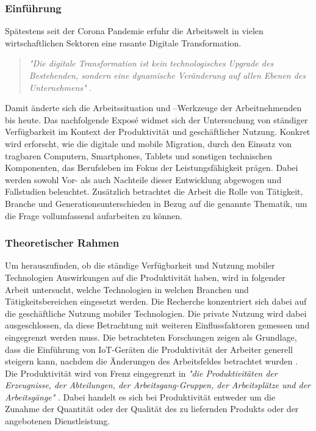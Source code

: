 \documentclass[12pt,a4paper]{article}
\title{\titlename}
\author{Reichard, Pia~~~Berger, Vivian~~~Engelhard, Philipp~~~Müller, Maximilian}
\date{\exposedate}
\begin{document}

\maketitle 
\thispagestyle{empty} %
\newpage	

\subsubsection*{Einführung }
Spätestens seit der Corona Pandemie erfuhr die Arbeitswelt in vielen wirtschaftlichen Sektoren eine rasante Digitale Transformation.

\begin{quote}
\emph{"Die digitale Transformation ist kein technologisches Upgrade des Bestehenden, sondern eine dynamische Veränderung auf allen Ebenen des Unternehmens"} \parencite{frauenhofer}.
\end{quote}

Damit änderte sich die Arbeitssituation und –Werkzeuge der Arbeitnehmenden bis heute. Das nachfolgende Exposé widmet sich der Untersuchung von ständiger Verfügbarkeit im Kontext der Produktivität und geschäftlicher Nutzung. Konkret wird erforscht, wie die digitale und mobile Migration, durch den Einsatz von tragbaren Computern, Smartphones, Tablets und sonstigen technischen Komponenten, das Berufsleben im Fokus der Leistungsfähigkeit prägen. Dabei werden sowohl Vor- als auch Nachteile dieser Entwicklung abgewogen und Fallstudien beleuchtet. Zusätzlich betrachtet die Arbeit die Rolle von Tätigkeit, Branche und Generationsunterschieden in Bezug auf die genannte Thematik, um die Frage vollumfassend aufarbeiten zu können.

\subsubsection*{Theoretischer Rahmen}
Um herauszufinden, ob die ständige Verfügbarkeit und Nutzung mobiler Technologien Auswirkungen auf die Produktivität haben, wird in folgender Arbeit untersucht, welche Technologien in welchen Branchen und Tätigkeitsbereichen eingesetzt werden. 
Die Recherche konzentriert sich dabei auf die geschäftliche Nutzung mobiler Technologien.  
Die private Nutzung wird dabei ausgeschlossen, da diese Betrachtung mit weiteren Einflussfaktoren gemessen und eingegrenzt werden muss.
Die betrachteten Forschungen zeigen als Grundlage, dass die Einführung von IoT-Geräten die Produktivität der Arbeiter generell steigern kann, nachdem die Änderungen des Arbeitsfeldes betrachtet wurden \parencite[vgl.][]{nappi2020internet}.
Die Produktivität wird von Frenz eingegrenzt in \emph{"die Produktivitäten der Erzeugnisse, der Abteilungen, der Arbeitsgang-Gruppen, der Arbeitsplätze und der Arbeitsgänge"} \parencite{frenz1963definition}.
Dabei handelt es sich bei Produktivität entweder um die Zunahme der Quantität oder der Qualität des zu liefernden Produkts oder der angebotenen Dienstleistung. 
\end{document}
